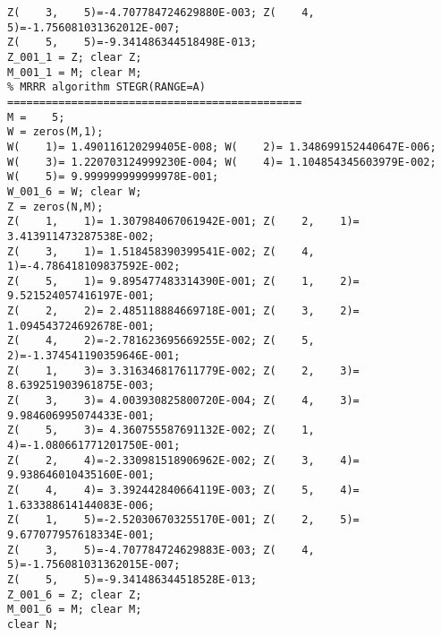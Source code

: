 \documentclass[acmtoms]{acmtrans2m}
\begin{document}
\begin{table}[htbp]
\begin{center}
\begin{minipage}[t]{4.5in}
{\begin{verbatim}
Z(    3,    5)=-4.707784724629880E-003; Z(    4,    5)=-1.756081031362012E-007; 
Z(    5,    5)=-9.341486344518498E-013; 
Z_001_1 = Z; clear Z;
M_001_1 = M; clear M;
% MRRR algorithm STEGR(RANGE=A) ==============================================
M =    5;
W = zeros(M,1);
W(    1)= 1.490116120299405E-008; W(    2)= 1.348699152440647E-006; 
W(    3)= 1.220703124999230E-004; W(    4)= 1.104854345603979E-002; 
W(    5)= 9.999999999999978E-001; 
W_001_6 = W; clear W;
Z = zeros(N,M);
Z(    1,    1)= 1.307984067061942E-001; Z(    2,    1)= 3.413911473287538E-002; 
Z(    3,    1)= 1.518458390399541E-002; Z(    4,    1)=-4.786418109837592E-002; 
Z(    5,    1)= 9.895477483314390E-001; Z(    1,    2)= 9.521524057416197E-001; 
Z(    2,    2)= 2.485118884669718E-001; Z(    3,    2)= 1.094543724692678E-001; 
Z(    4,    2)=-2.781623695669255E-002; Z(    5,    2)=-1.374541190359646E-001; 
Z(    1,    3)= 3.316346817611779E-002; Z(    2,    3)= 8.639251903961875E-003; 
Z(    3,    3)= 4.003930825800720E-004; Z(    4,    3)= 9.984606995074433E-001; 
Z(    5,    3)= 4.360755587691132E-002; Z(    1,    4)=-1.080661771201750E-001; 
Z(    2,    4)=-2.330981518906962E-002; Z(    3,    4)= 9.938646010435160E-001; 
Z(    4,    4)= 3.392442840664119E-003; Z(    5,    4)= 1.633388614144083E-006; 
Z(    1,    5)=-2.520306703255170E-001; Z(    2,    5)= 9.677077957618334E-001; 
Z(    3,    5)=-4.707784724629883E-003; Z(    4,    5)=-1.756081031362015E-007; 
Z(    5,    5)=-9.341486344518528E-013; 
Z_001_6 = Z; clear Z;
M_001_6 = M; clear M;
clear N;
\end{verbatim}
}
\end{minipage}
\end{center}
\end{table}
\end{document}
